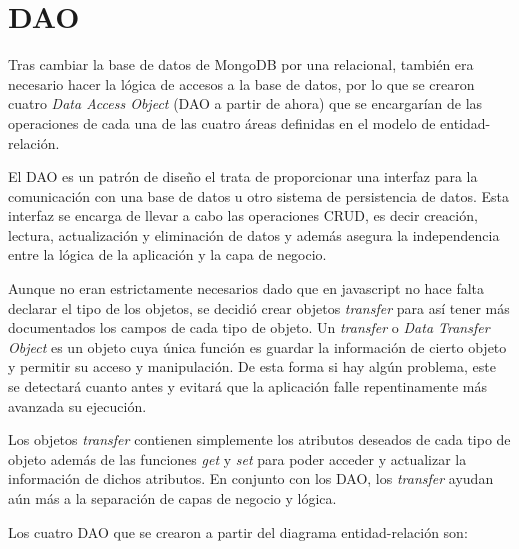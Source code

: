 \documentclass[11pt]{book}
\begin{document}
\chapter{DAO}\label{cap:daos}

Tras cambiar la base de datos de MongoDB por una relacional, también era necesario hacer la lógica de accesos a la base de datos, por lo que se crearon cuatro \emph{Data Access Object} (DAO a partir de ahora) que se encargarían de las operaciones de cada una de las cuatro áreas definidas en el modelo de entidad-relación.

El DAO es un patrón de diseño el trata de proporcionar una interfaz para la comunicación con una base de datos u otro sistema de persistencia de datos. Esta interfaz se encarga de llevar a cabo las operaciones CRUD, es decir creación, lectura, actualización y eliminación de datos y además asegura la independencia entre la lógica de la aplicación y la capa de negocio.

Aunque no eran estrictamente necesarios dado que en javascript no hace falta declarar el tipo de los objetos, se decidió crear objetos \emph{transfer} para así tener más documentados los campos de cada tipo de objeto.
Un \emph{transfer} o \emph{Data Transfer Object} es un objeto cuya única función es guardar la información de cierto objeto y permitir su acceso y manipulación.
De esta forma si hay algún problema, este se detectará cuanto antes y evitará que la aplicación falle repentinamente más avanzada su ejecución.

Los objetos \emph{transfer} contienen simplemente los atributos deseados de cada tipo de objeto además de las funciones \emph{get} y \emph{set} para poder acceder y actualizar la información de dichos atributos.
En conjunto con los DAO, los \emph{transfer} ayudan aún más a la separación de capas de negocio y lógica.

Los cuatro DAO que se crearon a partir del diagrama entidad-relación son:
\end{document}
